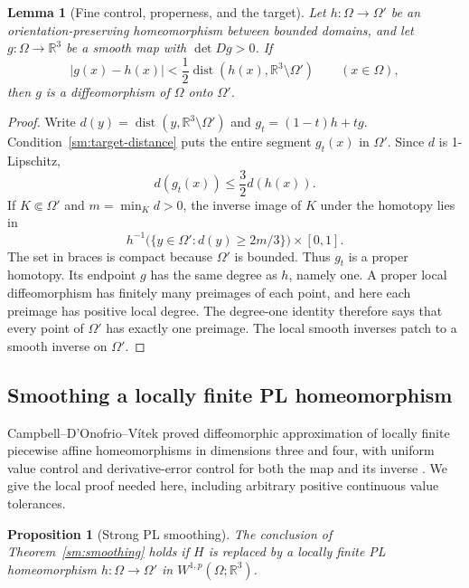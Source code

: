 \documentclass[11pt]{article}
\numberwithin{equation}{section}
\newtheorem{lemma}[theorem]{Lemma}
\newtheorem{proposition}[theorem]{Proposition}
\theoremstyle{definition}
\theoremstyle{remark}
\newcommand{\R}{\mathbb R}
\DeclareMathOperator{\dist}{dist}
\begin{document}
\begin{lemma}[Fine control, properness, and the target]
\label{sm:proper-degree}
Let $h:\Omega\to\Omega'$ be an orientation-preserving homeomorphism
between bounded domains, and let $g:\Omega\to\R^3$ be a smooth
map with $\det Dg>0$.  If
\begin{equation}
 \label{sm:target-distance}
 |g(x)-h(x)|<\frac12\dist(h(x),\R^3\setminus\Omega')
 \qquad(x\in\Omega),
\end{equation}
then $g$ is a diffeomorphism of $\Omega$ onto $\Omega'$.
\end{lemma}

\begin{proof}
Write $d(y)=\dist(y,\R^3\setminus\Omega')$ and
$g_t=(1-t)h+tg$.  Condition~\eqref{sm:target-distance} puts the entire
segment $g_t(x)$ in $\Omega'$.  Since $d$ is 1-Lipschitz,
\[
 d(g_t(x))\le\frac32d(h(x)).
\]
If $K\Subset\Omega'$ and $m=\min_Kd>0$, the inverse image of $K$
under the homotopy lies in
\[
 h^{-1}\bigl(\{y\in\Omega':d(y)\ge2m/3\}\bigr)\times[0,1].
\]
The set in braces is compact because $\Omega'$ is bounded.
Thus $g_t$ is a proper homotopy.  Its endpoint $g$ has the same
degree as $h$, namely one.  A proper local diffeomorphism has
finitely many preimages of each point, and here each preimage has
positive local degree.  The degree-one identity therefore says that
every point of $\Omega'$ has exactly one preimage.  The local smooth
inverses patch to a smooth inverse on $\Omega'$.
\end{proof}

\subsection{Smoothing a locally finite PL homeomorphism}

Campbell--D'Onofrio--V\'itek proved diffeomorphic approximation of
locally finite piecewise affine homeomorphisms in dimensions three
and four, with uniform value control and derivative-error control
for both the map and its inverse
\cite[Theorem~A]{CampbellDOnofrioVitek2026}.
We give the local proof needed here, including arbitrary positive
continuous value tolerances.

\begin{proposition}[Strong PL smoothing]
\label{sm:pl-smoothing}
The conclusion of Theorem~\ref{sm:smoothing} holds if $H$ is replaced
by a locally finite PL homeomorphism
$h:\Omega\to\Omega'$ in $W^{1,p}(\Omega;\R^3)$.
\end{proposition}
\end{document}
